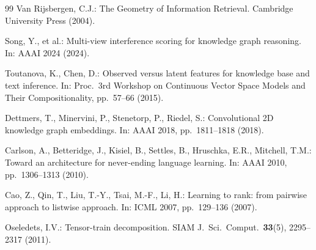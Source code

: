 \documentclass[runningheads]{llncs}
\begin{document}
\begin{thebibliography}{99}
Van Rijsbergen, C.J.:
The Geometry of Information Retrieval.
Cambridge University Press (2004).

Song, Y., et al.:
Multi-view interference scoring for knowledge graph reasoning.
In: AAAI 2024 (2024).

Toutanova, K., Chen, D.:
Observed versus latent features for knowledge base and text inference.
In: Proc.\ 3rd Workshop on Continuous Vector Space Models and Their
Compositionality, pp.~57--66 (2015).

Dettmers, T., Minervini, P., Stenetorp, P., Riedel, S.:
Convolutional 2D knowledge graph embeddings.
In: AAAI 2018, pp.~1811--1818 (2018).

Carlson, A., Betteridge, J., Kisiel, B., Settles, B., Hruschka, E.R.,
Mitchell, T.M.: Toward an architecture for never-ending language learning.
In: AAAI 2010, pp.~1306--1313 (2010).

Cao, Z., Qin, T., Liu, T.-Y., Tsai, M.-F., Li, H.:
Learning to rank: from pairwise approach to listwise approach.
In: ICML 2007, pp.~129--136 (2007).

Oseledets, I.V.:
Tensor-train decomposition.
SIAM J.\ Sci.\ Comput.\ \textbf{33}(5), 2295--2317 (2011).

\end{thebibliography}
\end{document}
